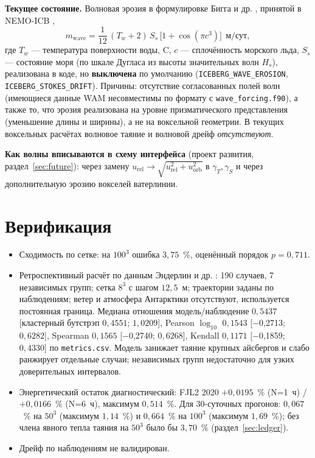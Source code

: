 \documentclass[12pt,a4paper]{article}
\newcommand{\code}[1]{\texttt{\small #1}}
\begin{document}
\textbf{Текущее состояние.} Волновая эрозия в формулировке Бигга и др. \cite{bigg1997}, принятой в NEMO-ICB \cite{marsh2015},
\begin{equation}
m_{\mathrm{wave}}=\frac{1}{12}\,(T_w+2)\,S_s\,\bigl[1+\cos(\pi c^3)\bigr]\ \ \text{м/сут},
\end{equation}
где $T_w$ --- температура поверхности воды, \textdegree C, $c$ --- сплочённость морского льда, $S_s$ --- состояние моря (по шкале Дугласа из высоты значительных волн $H_s$), реализована в коде, но \textbf{выключена} по умолчанию (\code{ICEBERG\_WAVE\_EROSION}, \code{ICEBERG\_STOKES\_DRIFT}). Причины: отсутствие согласованных полей волн (имеющиеся данные WAM несовместимы по формату с \code{wave\_forcing.f90}), а также то, что эрозия реализована на уровне призматического представления (уменьшение длины и ширины), а не на воксельной геометрии. В текущих воксельных расчётах волновое таяние и волновой дрейф \emph{отсутствуют}.

\textbf{Как волны вписываются в схему интерфейса} (проект развития, раздел~\ref{sec:future}): через замену $u_{\mathrm{rel}}\to\sqrt{u_{\mathrm{rel}}^2+u_{\mathrm{orb}}^2}$ в $\gamma_T,\gamma_S$ и через дополнительную эрозию вокселей ватерлинии.

\section{Верификация}

\begin{itemize}
\item Сходимость по сетке: на $100^3$ ошибка $3{,}75$~\%, оценённый порядок $p=0{,}711$.
\item Ретроспективный расчёт по данным Эндерлин и др. \cite{enderlin2023}: 190 случаев, 7 независимых групп; сетка $8^3$ с шагом $12{,}5$~м; траектории заданы по наблюдениям; ветер и атмосфера Антарктики отсутствуют, используется постоянная граница. Медиана отношения модель/наблюдение $0{,}5437$ [кластерный бутстрэп $0{,}4551$; $1{,}0209$], Pearson $\log_{10}$ $0{,}1543$ [$-$0{,}2713; $0{,}6282$], Spearman $0{,}1565$ [$-$0{,}2740; $0{,}6268$], Kendall $0{,}1171$ [$-$0{,}1859; $0{,}4330$] по \code{metrics.csv}. Модель занижает таяние крупных айсбергов и слабо ранжирует отдельные случаи; независимых групп недостаточно для узких доверительных интервалов.
\item Энергетический остаток диагностический: FJL2 2020 $+0{,}0195$~\% (N=1~ч) / $+0{,}0166$~\% (N=6~ч), максимум $0{,}514$~\%. Для 30-суточных прогонов: $0{,}067$~\% на $50^3$ (максимум $1{,}14$~\%) и $0{,}664$~\% на $100^3$ (максимум $1{,}69$~\%); без члена явного тепла таяния на $50^3$ было бы $3{,}70$~\% (раздел~\ref{sec:ledger}).
\item Дрейф по наблюдениям не валидирован.
\end{itemize}
\end{document}
